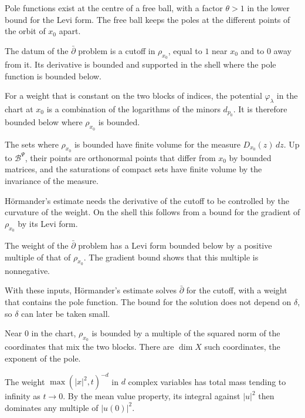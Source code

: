 Pole functions exist at the centre of a free ball, with a factor $\theta>1$ in the lower bound for the Levi
form. The free ball keeps the poles at the different points of the orbit of $x_0$ apart.

The datum of the $\bar\partial$ problem is a cutoff in $\rho_{x_0}$, equal to $1$ near $x_0$ and to $0$
away from it. Its derivative is bounded and supported in the shell where the pole function is bounded
below.

For a weight that is constant on the two blocks of indices, the potential $\varphi_\lambda$ in the chart at
$x_0$ is a combination of the logarithms of the minors $d_{p_0}$. It is therefore bounded below where
$\rho_{x_0}$ is bounded.

The sets where $\rho_{x_0}$ is bounded have finite volume for the measure $D_{x_0}(z)\,dz$. Up to
$\mathcal B^\Psi$, their points are orthonormal points that differ from $x_0$ by bounded matrices, and the
saturations of compact sets have finite volume by the invariance of the measure.

Hörmander's estimate needs the derivative of the cutoff to be controlled by the curvature of the weight.
On the shell this follows from a bound for the gradient of $\rho_{x_0}$ by its Levi form.

The weight of the $\bar\partial$ problem has a Levi form bounded below by a positive multiple of that of
$\rho_{x_0}$. The gradient bound shows that this multiple is nonnegative.

With these inputs, Hörmander's estimate solves $\bar\partial$ for the cutoff, with a weight that contains
the pole function. The bound for the solution does not depend on $\delta$, so $\delta$ can later be taken
small.

Near $0$ in the chart, $\rho_{x_0}$ is bounded by a multiple of the squared norm of the coordinates that
mix the two blocks. There are $\dim X$ such coordinates, the exponent of the pole.

The weight $\max(|x|^2,t)^{-d}$ in $d$ complex variables has total mass tending to infinity as $t\to0$. By
the mean value property, its integral against $|u|^2$ then dominates any multiple of $|u(0)|^2$.

